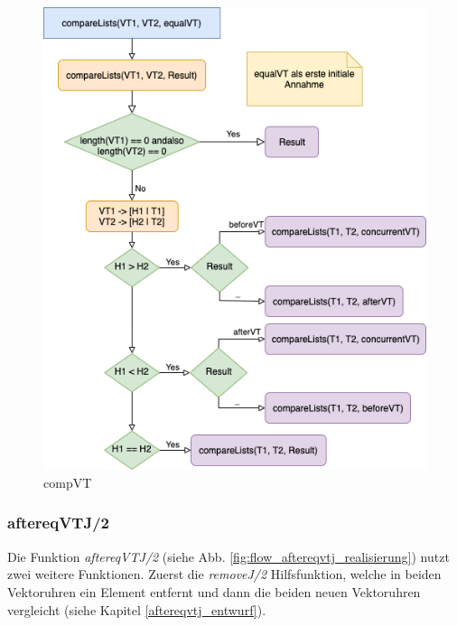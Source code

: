 \begin{figure}[htbp]
\begin{center}
\includegraphics[scale=0.6]{Latex/Bilder/compVT_realisierung.png}
\caption{\label{fig:flow_compVT_realisierung} compVT}
\end{center}
\end{figure}

\subsubsection{aftereqVTJ/2}

Die Funktion \textit{aftereqVTJ/2} (siehe Abb. \ref{fig:flow_aftereqvtj_realisierung}) nutzt zwei weitere Funktionen. Zuerst die \textit{removeJ/2} Hilfsfunktion, welche in beiden Vektoruhren ein Element entfernt und dann die beiden neuen Vektoruhren vergleicht (siehe Kapitel \ref{aftereqvtj_entwurf}).

